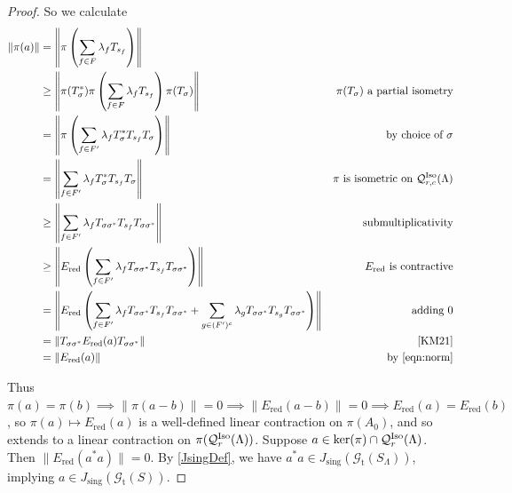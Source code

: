 \documentclass[12pt]{amsart}
\theoremstyle{definition}
\theoremstyle{remark}
\numberwithin{equation}{section}
\newcommand{\Q}{\mathcal{Q}}
\renewcommand{\L}{\Lambda}
\renewcommand{\a}{\alpha}
\newcommand{\Et}{\widehat E_{\text{tight}}}
\newcommand{\gt}{\mathcal{G}_{\text{t}}}
\newcommand{\Iso}{\textup{Iso}}
\newcommand{\Ered}{E_{\text{red}}}
\newcommand{\Js}{J_{\text{sing}}}
\begin{document}
\begin{proof}
		 So we calculate 
		\begin{align*}
			\|\pi(a)\| &= \left\|\pi\left(\sum_{f\in F}\lambda_fT_{s_f}\right)\right\|\\
			&\geq \left\|\pi(T_{\sigma}^*)\pi\left(\sum_{f\in F}\lambda_fT_{s_f}\right)\pi(T_{\sigma})\right\|&\text{$\pi(T_{\sigma})$ a partial isometry}\\
			&= \left\|\pi\left(\sum_{f\in F'}\lambda_fT_{\sigma}^*T_{s_f}T_{\sigma}\right)\right\|&\text{by choice of $\sigma$}\\
			& = \left\|\sum_{f\in F'}\lambda_fT_{\sigma}^*T_{s_f}T_{\sigma}\right\|&\text{$\pi$ is isometric on $\Q^\Iso_{r,c}(\L)$}\\
			&\geq  \left\|\sum_{f\in F'}\lambda_fT_{\sigma\sigma^*}T_{s_f}T_{\sigma\sigma^*}\right\|&\text{submultiplicativity}\\
			&\geq  \left\|\Ered\left(\sum_{f\in F'}\lambda_fT_{\sigma\sigma^*}T_{s_f}T_{\sigma\sigma^*}\right)\right\|&\text{$\Ered$ is contractive}\\
				&=  \left\|\Ered\left(\sum_{f\in F'}\lambda_fT_{\sigma\sigma^*}T_{s_f}T_{\sigma\sigma^*}+ \sum_{g\in (F')^c}\lambda_gT_{\sigma\sigma^*}T_{s_g}T_{\sigma\sigma^*} \right)\right\|&\text{adding }0\\
			&=\left\|T_{\sigma\sigma^*}\Ered(a)T_{\sigma\sigma^*}\right\|&\text{\cite[Lemma~3.2]{KM21}}\\
			& = \|\Ered(a)\| & \text{by \eqref{eqn:norm}}
		\end{align*}
		 
		 
		  
		 Thus $\pi(a) = \pi(b) \implies \|\pi(a-b)\| = 0 \implies \|\Ered(a-b)\| = 0 \implies \Ered(a) = \Ered(b)$, so $\pi(a)\mapsto \Ered(a)$ is a well-defined linear contraction on $\pi(A_0)$, and so extends to a linear contraction on $\pi(\Q^\Iso_{r}(\L))$. 
		Suppose $a\in\ker(\pi)\cap \Q^\Iso_{r}(\L)$. Then $\|\Ered(a^*a)\| = 0$.
		 By \eqref{JsingDef}, we have $a^*a\in \Js(\gt(S_\L))$, implying $a\in \Js(\gt(S))$.
	
	\end{proof}
	
\end{document}

